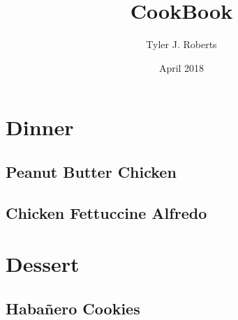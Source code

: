 \documentclass[a4paper,12pt]{article}
\begin{document}
\author{Tyler J. Roberts}
\title{CookBook}
\date{April 2018}

\maketitle
\newpage
\tableofcontents

\newpage
\section{Dinner}
\subsection{Peanut Butter Chicken}

\newpage

\subsection{Chicken Fettuccine Alfredo}

\newpage

\section{Dessert}
\subsection{Haba{\~{n}}ero Cookies}

\end{document}
